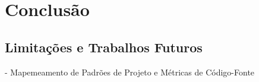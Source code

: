 \chapter{Conclusão}


\section{Limitações e Trabalhos Futuros}

- Mapemeamento de Padrões de Projeto e Métricas de Código-Fonte	